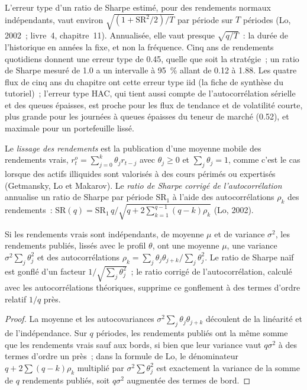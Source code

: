 L'erreur type d'un ratio de Sharpe estimé, pour des rendements normaux indépendants, vaut environ $\sqrt{(1 + \mathrm{SR}^2/2)/T}$ par période sur $T$ périodes (Lo,
2002~; livre~4, chapitre~11). Annualisée, elle vaut presque $\sqrt{q/T}$~: la durée de l'historique en années la fixe, et non la fréquence. Cinq ans de rendements quotidiens
donnent une erreur type de 0.45, quelle que soit la stratégie~; un ratio de Sharpe mesuré de 1.0 a un intervalle à 95~\% allant de 0.12 à 1.88. Les quatre flux de cinq ans du chapitre
ont cette erreur type iid (la fiche de synthèse du tutoriel)~; l'erreur type HAC, qui tient aussi compte de l'autocorrélation sérielle et des queues épaisses, est proche pour les
flux de tendance et de volatilité courte, plus grande pour les journées à queues épaisses du teneur de marché (0.52), et maximale pour un portefeuille lissé.

\begin{definition}\label{def:rs:performance-measurement:smoothing}
Le \emph{lissage des rendements} est la publication d'une moyenne mobile des rendements vrais, $r^o_t = \sum_{j=0}^{k}\theta_j r_{t-j}$ avec
$\theta_j \ge 0$ et $\sum_j\theta_j = 1$, comme c'est le cas lorsque des actifs illiquides sont valorisés à des cours périmés ou expertisés (Getmansky, Lo et Makarov). Le
\emph{ratio de Sharpe corrigé de l'autocorrélation} annualise un ratio de Sharpe par période $\mathrm{SR}_1$ à l'aide des
autocorrélations $\rho_k$ des rendements~: $\mathrm{SR}(q) = \mathrm{SR}_1\, q\big/\sqrt{q + 2\sum_{k=1}^{q-1}(q-k)\rho_k}$ (Lo, 2002).
\end{definition}

\begin{proposition}\label{prop:rs:performance-measurement:smoothing}
Si les rendements vrais sont indépendants, de moyenne $\mu$ et de variance $\sigma^2$, les rendements publiés, lissés avec le profil $\theta$, ont une moyenne $\mu$, une variance
$\sigma^2\sum_j\theta_j^2$ et des autocorrélations $\rho_k = \sum_j\theta_j\theta_{j+k}\big/\sum_j\theta_j^2$. Le ratio de Sharpe naïf est gonflé d'un facteur
$1/\sqrt{\sum_j\theta_j^2}$~; le ratio corrigé de l'autocorrélation, calculé avec les autocorrélations théoriques, supprime ce gonflement à des termes d'ordre relatif
$1/q$ près.
\end{proposition}

\begin{proof}
La moyenne et les autocovariances $\sigma^2\sum_j\theta_j\theta_{j+k}$ découlent de la linéarité et de l'indépendance. Sur $q$ périodes, les rendements publiés ont la même somme que les rendements vrais
sauf aux bords, si bien que leur variance vaut $q\sigma^2$ à des termes d'ordre un près~; dans la formule de Lo, le dénominateur $q + 2\sum(q-k)\rho_k$ multiplié par
$\sigma^2\sum\theta_j^2$ est exactement la variance de la somme de $q$ rendements publiés, soit $q\sigma^2$ augmentée des termes de bord.
\end{proof}

